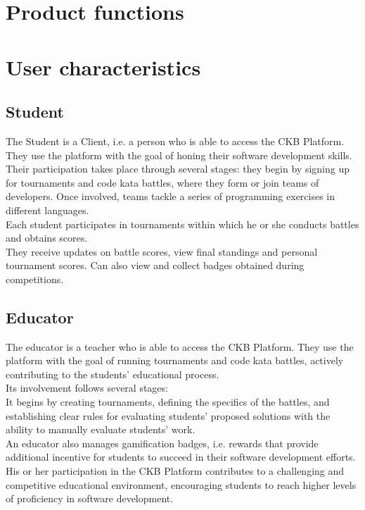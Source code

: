 \section{Product functions}



\section{User characteristics}
\subsection{Student}
The Student is a Client, i.e. a person who is able to access the CKB Platform.\\
They use the platform with the goal of honing their software development skills. Their participation takes place through several stages: they begin by signing up for tournaments and code kata battles, where they form or join teams of developers. Once involved, teams tackle a series of programming exercises in different languages. \\
Each student participates in tournaments within which he or she conducts battles and obtains scores.\\
They receive updates on battle scores, view final standings and personal tournament scores. Can also view and collect badges obtained during competitions.


\subsection{Educator}
The educator is a teacher who is able to access the CKB Platform. They use the platform with the goal of running tournaments and code kata battles, actively contributing to the students' educational process.\\
Its involvement follows several stages:\\
It begins by creating tournaments, defining the specifics of the battles, and establishing clear rules for evaluating students' proposed solutions with the ability to manually evaluate students' work.\\
An educator also manages gamification badges, i.e. rewards that provide additional incentive for students to succeed in their software development efforts.\\
His or her participation in the CKB Platform contributes to a challenging and competitive educational environment, encouraging students to reach higher levels of proficiency in software development.

